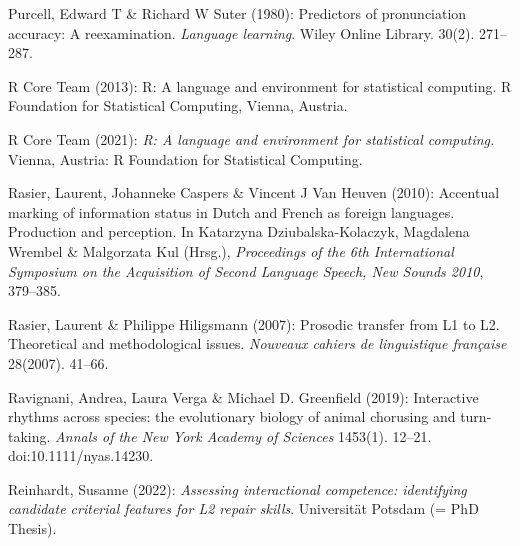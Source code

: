 \begin{styleBibliography}
Purcell, Edward T \& Richard W Suter (1980): Predictors of pronunciation accuracy: A reexamination. \textit{Language learning}. Wiley Online Library. 30(2). 271–287.
\end{styleBibliography}

\begin{styleBibliography}
R Core Team (2013): R: A language and environment for statistical computing. R Foundation for Statistical Computing, Vienna, Austria.
\end{styleBibliography}

\begin{styleBibliography}
R Core Team (2021): \textit{R: A language and environment for statistical computing.} Vienna, Austria: R Foundation for Statistical Computing.
\end{styleBibliography}

\begin{styleBibliography}
Rasier, Laurent, Johanneke Caspers \& Vincent J Van Heuven (2010): Accentual marking of information status in Dutch and French as foreign languages. Production and perception. In Katarzyna Dziubalska-Kolaczyk, Magdalena Wrembel \& Malgorzata Kul (Hrsg.), \textit{Proceedings of the 6th International Symposium on the Acquisition of Second Language Speech, New Sounds 2010}, 379–385.
\end{styleBibliography}

\begin{styleBibliography}
Rasier, Laurent \& Philippe Hiligsmann (2007): Prosodic transfer from L1 to L2. Theoretical and methodological issues. \textit{Nouveaux cahiers de linguistique française} 28(2007). 41–66.
\end{styleBibliography}

\begin{styleBibliography}
Ravignani, Andrea, Laura Verga \& Michael D. Greenfield (2019): Interactive rhythms across species: the evolutionary biology of animal chorusing and turn-taking. \textit{Annals of the New York Academy of Sciences} 1453(1). 12–21. doi:10.1111/nyas.14230.
\end{styleBibliography}

\begin{styleBibliography}
Reinhardt, Susanne (2022): \textit{Assessing interactional competence: identifying candidate criterial features for L2 repair skills}. Universität Potsdam (= PhD Thesis).
\end{styleBibliography}

